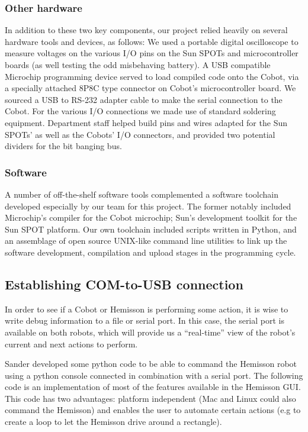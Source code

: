 \documentclass[a4paper,10pt]{article} %
\begin{document}
\subsubsection{Other hardware}

\noindent In addition to these two key components, our project relied heavily on
several hardware tools and devices, as follows: We used a portable digital
oscilloscope to measure voltages on the various I/O pins on the Sun SPOTs and
microcontroller boards (as well testing the odd misbehaving battery). A USB
compatible Microchip programming device served to load compiled code onto the
Cobot, via a specially attached 8P8C type connector on Cobot's microcontroller
board. We sourced a USB to RS-232 adapter cable to make the serial connection to
the Cobot. For the various I/O connections we made use of standard soldering
equipment. Department staff helped build pins and wires adapted for the Sun
SPOTs' as well as the Cobots' I/O connectors, and provided two potential
dividers for the bit banging bus.

\subsubsection{Software}

A number of off-the-shelf software tools complemented a software toolchain
developed especially by our team for this project. The former notably included
Microchip's compiler for the Cobot microchip; Sun's development toolkit for the
Sun SPOT platform. Our own toolchain included scripts written in Python, and an
assemblage of open source UNIX-like command line utilities to link up the
software development, compilation and upload stages in the programming cycle.


\subsection{Establishing COM-to-USB connection} %
\label{sub:Establishing COM-to-USB connection}

In order to see if a Cobot or Hemisson is performing some action, it is wise to
write debug information to a file or serial port. In this case, the serial port
is available on both robots, which will provide us a ``real-time'' view of the
robot's current and next actions to perform.

Sander developed some python code to be able to command the Hemisson robot using
a python console connected in combination with a serial port. The following code
is an implementation of most of the features available in the Hemisson GUI.
This code has two advantages: platform independent (Mac and Linux could also
command the Hemisson) and enables the user to automate certain actions (e.g to
create a loop to let the Hemisson drive around a rectangle).
\end{document}
